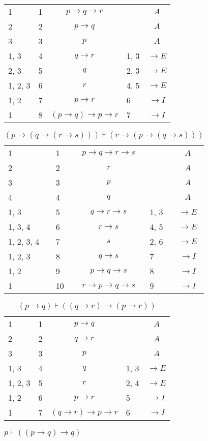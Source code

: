 \documentclass{article}
\begin{document}
\begin{table}[htbp]
\begin{tabular}{lllll}
{1} & 1 & $$p→q→r$$ & {} & $$A$$ \\
{2} & 2 & $$p→q$$ & {} & $$A$$ \\
{3} & 3 & $$p$$ & {} & $$A$$ \\
{1, 3} & 4 & $$q→r$$ & {1, 3} & $$→E$$ \\
{2, 3} & 5 & $$q$$ & {2, 3} & $$→E$$ \\
{1, 2, 3} & 6 & $$r$$ & {4, 5} & $$→E$$ \\
{1, 2} & 7 & $$p→r$$ & {6} & $$→I$$ \\
{1} & 8 & $$(p→q)→p→r$$ & {7} & $$→I$$ \\
\end{tabular}
\end{table}\begin{table}[htbp]\caption*{$(p → (q → (r → s))) ⊦ (r → (p → (q → s)))$}\centering\begin{tabular}{lllll}
{1} & 1 & $$p→q→r→s$$ & {} & $$A$$ \\
{2} & 2 & $$r$$ & {} & $$A$$ \\
{3} & 3 & $$p$$ & {} & $$A$$ \\
{4} & 4 & $$q$$ & {} & $$A$$ \\
{1, 3} & 5 & $$q→r→s$$ & {1, 3} & $$→E$$ \\
{1, 3, 4} & 6 & $$r→s$$ & {4, 5} & $$→E$$ \\
{1, 2, 3, 4} & 7 & $$s$$ & {2, 6} & $$→E$$ \\
{1, 2, 3} & 8 & $$q→s$$ & {7} & $$→I$$ \\
{1, 2} & 9 & $$p→q→s$$ & {8} & $$→I$$ \\
{1} & 10 & $$r→p→q→s$$ & {9} & $$→I$$ \\
\end{tabular}
\end{table}\begin{table}[htbp]\caption*{$(p → q) ⊦ ((q → r) → (p → r))$}\centering\begin{tabular}{lllll}
{1} & 1 & $$p→q$$ & {} & $$A$$ \\
{2} & 2 & $$q→r$$ & {} & $$A$$ \\
{3} & 3 & $$p$$ & {} & $$A$$ \\
{1, 3} & 4 & $$q$$ & {1, 3} & $$→E$$ \\
{1, 2, 3} & 5 & $$r$$ & {2, 4} & $$→E$$ \\
{1, 2} & 6 & $$p→r$$ & {5} & $$→I$$ \\
{1} & 7 & $$(q→r)→p→r$$ & {6} & $$→I$$ \\
\end{tabular}
\end{table}\begin{table}[htbp]\caption*{$p ⊦ ((p → q) → q)$}\centering\begin{tabular}{lllll}

\end{tabular}
\end{table}
\end{document}
